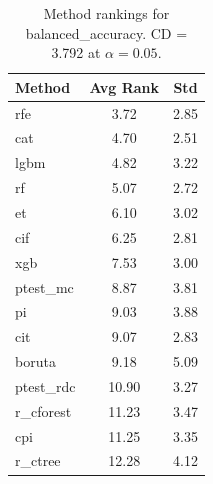 \begin{table}[h]
\centering
\caption{Method rankings for balanced_accuracy. CD = 3.792 at $\alpha=0.05$.}
\label{tab:ranks_balanced_accuracy}
\begin{tabular}{lcc}
\toprule
Method & Avg Rank & Std \\
\midrule
rfe & 3.72 & 2.85 \\
cat & 4.70 & 2.51 \\
lgbm & 4.82 & 3.22 \\
rf & 5.07 & 2.72 \\
et & 6.10 & 3.02 \\
cif & 6.25 & 2.81 \\
xgb & 7.53 & 3.00 \\
ptest_mc & 8.87 & 3.81 \\
pi & 9.03 & 3.88 \\
cit & 9.07 & 2.83 \\
boruta & 9.18 & 5.09 \\
ptest_rdc & 10.90 & 3.27 \\
r_cforest & 11.23 & 3.47 \\
cpi & 11.25 & 3.35 \\
r_ctree & 12.28 & 4.12 \\
\bottomrule
\end{tabular}
\end{table}